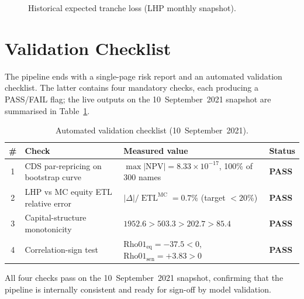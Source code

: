 \documentclass[11pt,a4paper]{article}
\newcommand{\1}{\mathbf{1}}
\DeclareMathOperator{\ETL}{ETL}
\begin{document}
\begin{figure}[H]
    \centering
    \caption{Historical expected tranche loss (LHP monthly snapshot).}
    \label{fig:hist_dashboard}
\end{figure}

\section{Validation Checklist}\label{sec:validation}

The pipeline ends with a single-page risk report and an automated
validation checklist. The latter contains four mandatory checks,
each producing a PASS/FAIL flag; the live outputs on the
10~September~2021 snapshot are summarised in
Table~\ref{tab:validation}.

\begin{table}[H]
\centering
\caption{Automated validation checklist
(10~September~2021).}
\label{tab:validation}
\begin{tabular}{c l l l}
\toprule
\textbf{\#} & \textbf{Check} & \textbf{Measured value} & \textbf{Status}\\
\midrule
1 & CDS par-repricing on bootstrap curve
  & $\max|\mathrm{NPV}|=8.33\!\times\!10^{-17}$, 100\% of 300 names
  & \textbf{PASS}\\
2 & LHP vs MC equity ETL relative error
  & $|\Delta|/\ETL^{\mathrm{MC}} = 0.7\%$ (target \(<20\%\))
  & \textbf{PASS}\\
3 & Capital-structure monotonicity
  & $1952.6 > 503.3 > 202.7 > 85.4$
  & \textbf{PASS}\\
4 & Correlation-sign test
  & $\mathrm{Rho01}_{\mathrm{eq}}=-37.5 <0$,
    $\mathrm{Rho01}_{\mathrm{sen}}=+3.83 >0$
  & \textbf{PASS}\\
\bottomrule
\end{tabular}
\end{table}

All four checks pass on the 10~September~2021 snapshot, confirming
that the pipeline is internally consistent and ready for sign-off by
model validation.
\end{document}
